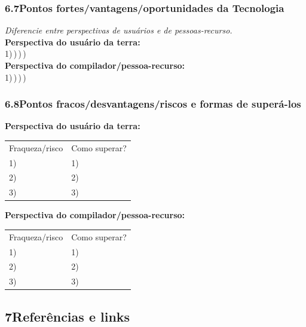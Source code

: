 \subsubsection*{6.7\quad Pontos fortes/vantagens/oportunidades da Tecnologia}

\textit{Diferencie entre perspectivas de usuários e de pessoas-recurso.}\\[4pt]
\textbf{Perspectiva do usuário da terra:}\\
1)\,\dotfill {})\,\dotfill {})\,\dotfill {})\,\dotfill\\[4pt]
\textbf{Perspectiva do compilador/pessoa-recurso:}\\
1)\,\dotfill {})\,\dotfill {})\,\dotfill {})\,\dotfill

\subsubsection*{6.8\quad Pontos fracos/desvantagens/riscos e formas de superá-los}

\textbf{Perspectiva do usuário da terra:}\\
\begin{tabular}{p{7cm}p{7cm}}
Fraqueza/risco & Como superar? \\
1)\,\dotfill & 1)\,\dotfill \\
2)\,\dotfill & 2)\,\dotfill \\
3)\,\dotfill & 3)\,\dotfill \\
\end{tabular}

\medskip\noindent
\textbf{Perspectiva do compilador/pessoa-recurso:}\\
\begin{tabular}{p{7cm}p{7cm}}
Fraqueza/risco & Como superar? \\
1)\,\dotfill & 1)\,\dotfill \\
2)\,\dotfill & 2)\,\dotfill \\
3)\,\dotfill & 3)\,\dotfill \\
\end{tabular}

\subsection*{7\quad Referências e links}

